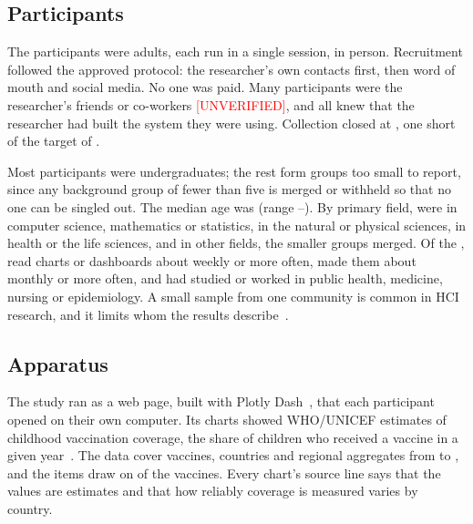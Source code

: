 \documentclass[10pt,twocolumn]{article}
\newcommand{\unverified}{\textcolor{red}{[UNVERIFIED]}}
\begin{document}
\subsection{Participants}
\label{sec:participants}

The participants were  adults, each run in a single session, in person. Recruitment followed the approved protocol: the researcher's own contacts first, then word of mouth and social media. No one was paid. Many participants were the researcher's friends or co-workers \unverified, and all knew that the researcher had built the system they were using. Collection closed at , one short of the target of .

Most participants were undergraduates; the rest form groups too small to report, since any background group of fewer than five is merged or withheld so that no one can be singled out. The median age was  (range --). By primary field,  were in computer science, mathematics or statistics,  in the natural or physical sciences,  in health or the life sciences, and  in other fields, the smaller groups merged. Of the ,  read charts or dashboards about weekly or more often,  made them about monthly or more often, and  had studied or worked in public health, medicine, nursing or epidemiology. A small sample from one community is common in HCI research, and it limits whom the results describe~\cite{caine2016,linxen2021}.

\subsection{Apparatus}
\label{sec:apparatus}

The study ran as a web page, built with Plotly Dash~\cite{plotly2015}, that each participant opened on their own computer. Its charts showed WHO/UNICEF estimates of childhood vaccination coverage, the share of children who received a vaccine in a given year~\cite{owid2026vaccination,burton2009}. The data cover  vaccines,  countries and  regional aggregates from  to , and the items draw on  of the vaccines. Every chart's source line says that the values are estimates and that how reliably coverage is measured varies by country.
\end{document}
